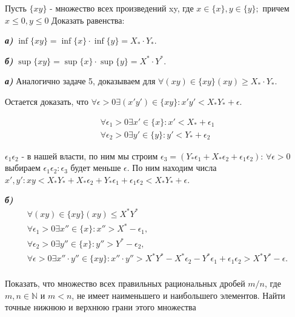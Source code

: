 \documentclass[10pt]{article}
\begin{document}
\begin{problem}
Пусть $\{xy\}$ - множество всех произведений xy, где $x \in \{x\},y \in \{y\};$ причем $x\leq 0,y\leq 0$ Доказать равенства:

\emph{\textbf{а)}} $\inf\{xy\}=\inf\{x\}\cdot\inf\{y\}=X_*\cdot Y_*$.

\emph{\textbf{б)}} $\sup\{xy\}=\sup\{x\}\cdot\sup\{y\}=X^*\cdot Y^*$.
\end{problem}

\begin{solution}
\emph{\textbf{а)}} Аналогично задаче 5, доказываем для $\forall (xy)\in\{xy\} (xy)\geq X_*\cdot Y_*$.

Остается доказать, что $\forall \epsilon >0 \exists (x'y')\in\{xy\}: x'y'<X_* Y_* + \epsilon$.
\medskip

\begin{equation}
\begin{gathered} 
\forall \epsilon_1 >0 \exists x' \in \{x\}: x'<X_*+\epsilon_1 \\ 
\forall \epsilon_2>0 \exists y' \in \{y\}: y'<Y_* + \epsilon_2 
\end{gathered} 
\end{equation}

$\epsilon_1 \epsilon_2$ - в нашей власти, по ним мы строим $\epsilon_3=(Y_*\epsilon_1 + X_*\epsilon_2 + \epsilon_1 \epsilon_2)$:
$\forall \epsilon > 0$ выбираем $\epsilon_1 \epsilon_2 : \epsilon_3$ будет меньше $\epsilon$. По ним находим числа 
$x',y' : xy<X_*Y_* + X_*\epsilon_2 + Y_*\epsilon_1 + \epsilon_1 \epsilon_2 < X_*Y_* + \epsilon$.

\medskip

\emph{\textbf{б)}}
\begin{equation}
\begin{gathered} 
\forall(xy) \in \{xy\} (xy)\leq X^* Y^* \\
\forall \epsilon_1 >0 \exists x'' \in \{x\}: x''>X^*-\epsilon_1, \\
\forall \epsilon_2 >0 \exists y'' \in \{x\}: y''>Y^*-\epsilon_2, \\
\forall \epsilon >0 \exists x''\cdot y'' \in \{xy\} : x''\cdot y'' > X^*Y^* - X^* \epsilon_2 - Y^*\epsilon_1 + \epsilon_1 \epsilon_2 > X^*Y^*-\epsilon. \\
\end{gathered} 
\end{equation}
\end{solution}



\begin{problem}
Показать, что множество всех правильных рациональных дробей $m/n$, где $m,n\in\mathbb{N}$ и $m<n$, не имеет наименьшего и наибольшего элементов. Найти точные нижнюю и верхнюю грани этого множества
\end{problem}
\end{document}
